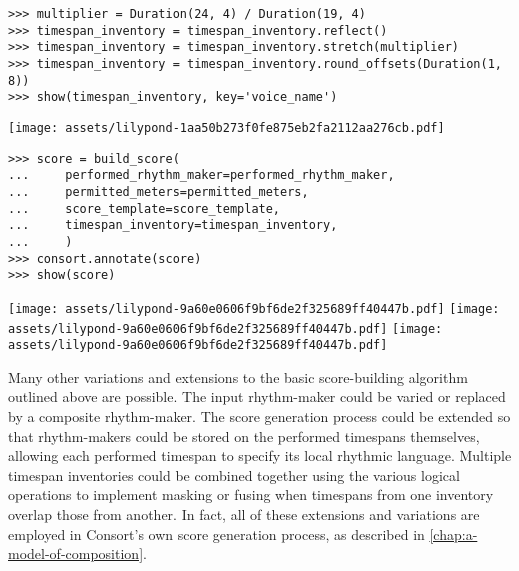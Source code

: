 \begin{abjadbookoutput}
\begin{singlespacing}
\vspace{-0.5\baselineskip}
\begin{verbatim}
>>> multiplier = Duration(24, 4) / Duration(19, 4)
>>> timespan_inventory = timespan_inventory.reflect()
>>> timespan_inventory = timespan_inventory.stretch(multiplier)
>>> timespan_inventory = timespan_inventory.round_offsets(Duration(1, 8))
>>> show(timespan_inventory, key='voice_name')
\end{verbatim}
\noindent\texttt{[image: assets/lilypond-1aa50b273f0fe875eb2fa2112aa276cb.pdf]}
\begin{verbatim}
>>> score = build_score(
...     performed_rhythm_maker=performed_rhythm_maker,
...     permitted_meters=permitted_meters,
...     score_template=score_template,
...     timespan_inventory=timespan_inventory,
...     )
>>> consort.annotate(score)
>>> show(score)
\end{verbatim}
\noindent\texttt{[image: assets/lilypond-9a60e0606f9bf6de2f325689ff40447b.pdf]}
\newline
\newline
\noindent\texttt{[image: assets/lilypond-9a60e0606f9bf6de2f325689ff40447b.pdf]}
\newline
\newline
\noindent\texttt{[image: assets/lilypond-9a60e0606f9bf6de2f325689ff40447b.pdf]}
\end{singlespacing}
\end{abjadbookoutput}

\noindent Many other variations and extensions to the basic score-building
algorithm outlined above are possible. The input rhythm-maker could be varied
or replaced by a composite rhythm-maker. The score generation process could be
extended so that rhythm-makers could be stored on the performed timespans
themselves, allowing each performed timespan to specify its local rhythmic
language. Multiple timespan inventories could be combined together using the
various logical operations to implement masking or fusing when timespans from
one inventory overlap those from another. In fact, all of these extensions and
variations are employed in Consort's own score generation process, as described
in \autoref{chap:a-model-of-composition}.